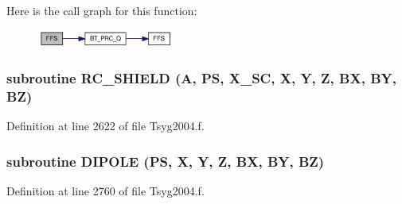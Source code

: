 Here is the call graph for this function:\nopagebreak
\begin{figure}[H]
\begin{center}
\leavevmode
\includegraphics[width=127pt]{_tsyg2004_8f_8d9b5c31c4fb074683c40c0fa923c3a2_cgraph}
\end{center}
\end{figure}
\hypertarget{_tsyg2004_8f_f5b31c6f54b60f926656e483aa50ebac}{
\subsubsection[{RC\_\-SHIELD}]{\setlength{\rightskip}{0pt plus 5cm}subroutine RC\_\-SHIELD (A, \/  PS, \/  X\_\-SC, \/  X, \/  Y, \/  Z, \/  BX, \/  BY, \/  BZ)}}
\label{_tsyg2004_8f_f5b31c6f54b60f926656e483aa50ebac}




Definition at line 2622 of file Tsyg2004.f.\hypertarget{_tsyg2004_8f_b2b4bf9a582d902f19522d4db9af8f34}{
\subsubsection[{DIPOLE}]{\setlength{\rightskip}{0pt plus 5cm}subroutine DIPOLE (PS, \/  X, \/  Y, \/  Z, \/  BX, \/  BY, \/  BZ)}}
\label{_tsyg2004_8f_b2b4bf9a582d902f19522d4db9af8f34}




Definition at line 2760 of file Tsyg2004.f.